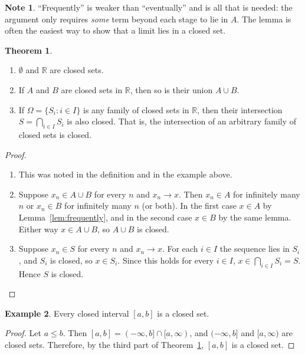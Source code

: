 \documentclass[11pt,a4paper]{article}
\numberwithin{equation}{section}
\theoremstyle{definition}
\newtheorem{thm}{Theorem}[subsection]
\newtheorem{exa}[thm]{Example}
\newtheorem*{note}{Note}
\begin{document}
\begin{note}
``Frequently'' is weaker than ``eventually'' and is all that is needed: the argument only requires \emph{some} term beyond each stage to lie in $A$. The lemma is often the easiest way to show that a limit lies in a closed set.
\end{note}


\begin{thm}\label{thm:closedsets}
\begin{enumerate}
\item $\emptyset$ and $\mathbb{R}$ are closed sets.
\item If $A$ and $B$ are closed sets in $\mathbb{R}$, then so is their union $A\cup B$.
\item If $\Omega = \{ S_i : i \in I\}$ is any family of closed sets in $\mathbb{R}$, then their intersection $S = \bigcap_{i\in I} S_i$ is also closed. That is, the intersection of an arbitrary family of closed sets is closed.
\end{enumerate}
\end{thm}

\begin{proof}
\begin{enumerate}
\item This was noted in the definition and in the example above.

\item Suppose $x_n \in A\cup B$ for every $n$ and $x_n \longrightarrow x$. Then $x_n\in A$ for infinitely many $n$ or $x_n\in B$ for infinitely many $n$ (or both). In the first case $x\in A$ by Lemma~\ref{lem:frequently}, and in the second case $x \in B$ by the same lemma. Either way $x\in A\cup B$, so $A\cup B$ is closed.

\item Suppose $x_n \in S$ for every $n$ and $x_n \longrightarrow x$. For each $i\in I$ the sequence lies in $S_i$, and $S_i$ is closed, so $x\in S_i$. Since this holds for every $i\in I$, $x\in \bigcap_{i \in I} S_i = S$. Hence $S$ is closed.
\end{enumerate}
\end{proof}


\begin{exa}
Every closed interval $[a,b]$ is a closed set.
\end{exa}

\begin{proof}
Let $a\leq b$. Then $[a,b]= (-\infty, b]\cap [a,\infty)$, and $(-\infty , b]$ and $[a,\infty)$ are closed sets. Therefore, by the third part of Theorem~\ref{thm:closedsets}, $[a,b]$ is a closed set.
\end{proof}
\end{document}
